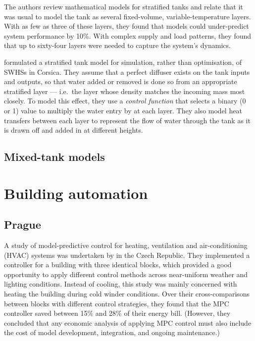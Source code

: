 The authors review mathematical models for stratified tanks and relate that it was usual to model the tank as several fixed-volume, variable-temperature layers.
With as few as three of these layers, they found that models could under-predict system performance by 10\%.
With complex supply and load patterns, they found that up to sixty-four layers were needed to capture the system's dynamics.

\textcite{Cristofari02} formulated a stratified tank model for simulation, rather than optimisation, of SWHSs in Corsica.
They assume that a perfect diffuser exists on the tank inputs and outputs, so that water added or removed is done so from an appropriate stratified layer --- i.e.\ the layer whose density matches the incoming mass most closely.
To model this effect, they use a \emph{control function} that selects a binary (0 or 1) value to multiply the water entry by at each layer.
They also model heat transfers between each layer to represent the flow of water through the tank as it is drawn off and added in at different heights.


\subsection{Mixed-tank models}
\label{sec:review:mixed-tank}


\section{Building automation}

\subsection{Prague}

A study of model-predictive control for heating, ventilation and
air-conditioning (HVAC) systems was undertaken by \textcite{Siroky11} in the Czech Republic.
They implemented a controller for a building with three identical blocks, which provided a good opportunity to apply different control methods across near-uniform weather and lighting conditions.
Instead of cooling, this study was mainly concerned with heating the building during cold winder conditions.
Over their cross-comparisons between blocks with different control strategies, they found that the MPC controller saved between 15\% and 28\% of their energy bill.
(However, they concluded that any economic analysis of applying MPC control must also include the cost of model development, integration, and ongoing maintenance.)

